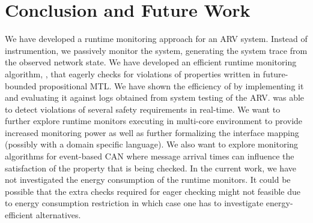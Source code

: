 
\section{Conclusion and Future Work}
We have developed a runtime monitoring approach for an ARV system.
Instead of instrumention, we passively monitor the system,
generating the system trace from the observed network state.
We have developed an efficient runtime monitoring algorithm, \monitor,
that eagerly checks for violations of properties written in future-bounded
propositional MTL. We have shown the efficiency of \monitor by implementing it
and evaluating it against logs obtained from system testing of the ARV.
\monitor was able to detect violations of several safety requirements in real-time.
We want to further explore runtime monitors executing in multi-core environment
to provide increased monitoring power as well as further
formalizing the interface mapping (possibly with a domain specific language).
We also want to explore monitoring algorithms for event-based CAN where
message arrival times can influence the satisfaction of the property that is
being checked. In the current work, we have not investigated the energy consumption
of the runtime monitors. It could be possible that the extra checks required for
eager checking might not feasible due to energy consumption
restriction in which case one has to investigate energy-efficient alternatives.

